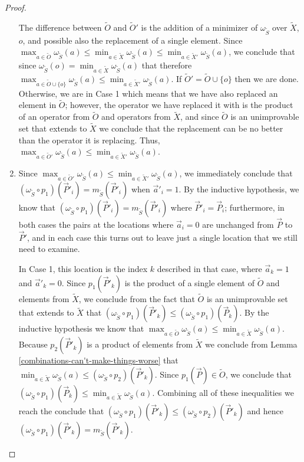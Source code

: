 \documentclass[12pt]{amsbook}
\theoremstyle{plain}
\theoremstyle{definition}
\theoremstyle{remark}
\newcommand{\lst}{\vec}
\newcommand{\set}{\tilde}
\newcommand{\om}{\omega}
\begin{document}
\begin{proof}
\begin{enumerate}
The difference between $\set O$ and $\set O'$ is the addition of a minimizer of $\om_{\set S}$ over $\set X$, $o$, and possible also the replacement of a single element.  Since $\max_{a\in\set O}\om_{\set S}(a)\le\min_{a\in\set X}\om_{\set S}(a)\le\min_{a\in\set X'}\om_{\set S}(a)$, we conclude that since $\om_{\set S}(o)=\min_{a\in\set X}\om_{\set S}(a)$ that therefore $\max_{a\in\set O\cup\{o\}}\om_{\set S}(a)\le\min_{a\in\set X'}\om_{\set S}(a)$.  If $\set O'=\set O\cup\{o\}$ then we are done.  Otherwise, we are in Case 1 which means that we have also replaced an element in $\set O$;  however, the operator we have replaced it with is the product of an operator from $\set O$ and operators from $\set X$, and since $\set O$ is an unimprovable set that extends to $\set X$ we conclude that the replacement can be no better than the operator it is replacing.  Thus, $\max_{a\in\set O'}\om_{\set S}(a)\le\min_{a\in\set X'}\om_{\set S}(a)$.
\item

Since $\max_{a\in\set O'}\om_{\set S}(a)\le\min_{a\in\set X'}\om_{\set S}(a)$, we immediately conclude that $(\om_{\set S}\circ p_1)(\lst P'_i)=m_{\set S}(\lst P'_i)$ when $\lst a'_i=1$.  By the inductive hypothesis, we know that $(\om_{\set S}\circ p_1)(\lst P'_i)=m_{\set S}(\lst P'_i)$ where $\lst P'_i=\lst P_i$;  furthermore, in both cases the pairs at the locations where $\lst a_i=0$ are unchanged from $\lst P$ to $\lst P'$, and in each case this turns out to leave just a single location that we still need to examine.

In Case 1, this location is the index $k$ described in that case, where $\lst a_k=1$ and $\lst a'_k=0$.  Since $p_1(\lst P'_k)$ is the product of a single element of $\set O$ and elements from $\set X$, we conclude from the fact that $\set O$ is an unimprovable set that extends to $\set X$ that $(\om_{\set S}\circ p_1)(\lst P'_k)\le(\om_{\set S}\circ p_1)(\lst P_k)$.  By the inductive hypothesis we know that $\max_{a\in\set O}\om_{\set S}(a)\le\min_{a\in\set X}\om_{\set S}(a)$.  Because $p_2(\lst P'_k)$ is a product of elements from $\set X$ we conclude from Lemma \ref{combinations-can't-make-things-worse} that $\min_{a\in\set X}\om_{\set S}(a)\le (\om_{\set S}\circ p_2)(\lst P'_k)$.  Since $p_1(\lst P)\in\set O$, we conclude that $(\om_{\set S}\circ p_1)(\lst P_k)\le\min_{a\in\set X}\om_{\set S}(a)$.  Combining all of these inequalities we reach the conclude that $(\om_{\set S}\circ p_1)(\lst P'_k)\le(\om_{\set S}\circ p_2)(\lst P'_k)$ and hence $(\om_{\set S}\circ p_1)(\lst P'_k)=m_{\set S}(\lst P'_k)$.


\end{enumerate}
\end{proof}
\end{document}

